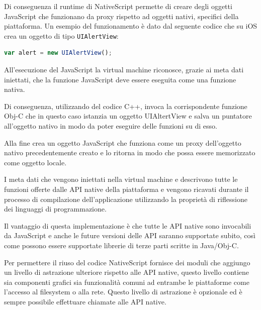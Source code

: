 Di conseguenza il runtime di NativeScript permette di creare degli oggetti JavaScript che funzionano da proxy rispetto ad oggetti nativi, specifici della piattaforma.
Un esempio del funzionamento è dato dal seguente codice che su iOS crea un oggetto di tipo \texttt{UIAlertView}:

\begin{lstlisting}[language=JavaScript, caption=Esempio di creazione di un oggetto nativo]
var alert = new UIAlertView();
\end{lstlisting}

All'esecuzione del JavaScript la virtual machine riconosce, grazie ai meta dati iniettati, che la funzione JavaScript deve essere eseguita come una funzione nativa.

Di conseguenza, utilizzando del codice C++, invoca la corrispondente funzione Obj-C che in questo caso istanzia un oggetto UIAltertView e salva un puntatore all'oggetto nativo in modo da poter eseguire delle funzioni su di esso.

Alla fine crea un oggetto JavaScript che funziona come un proxy dell'oggetto nativo precedentemente creato e lo ritorna in modo che possa essere memorizzato come oggetto locale.

I meta dati che vengono iniettati nella virtual machine e descrivono tutte le funzioni offerte dalle API native della piattaforma e vengono ricavati durante il processo di compilazione dell'applicazione utilizzando la proprietà di riflessione dei linguaggi di programmazione.

Il vantaggio di questa implementazione è che tutte le API native sono invocabili da JavaScript e anche le future versioni delle API saranno supportate subito, così come possono essere supportate librerie di terze parti scritte in Java/Obj-C.

Per permettere il riuso del codice NativeScript fornisce dei moduli che aggiungo un livello di astrazione ulteriore rispetto alle API native, questo livello contiene sia componenti grafici sia funzionalità comuni ad entrambe le piattaforme come l'accesso al filesystem o alla rete.
Questo livello di astrazione è opzionale ed è sempre possibile effettuare chiamate alle API native.

